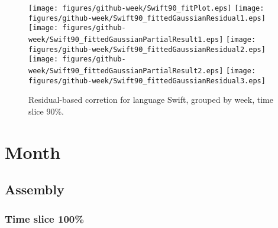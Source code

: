 \begin{figure}[t]
\centering
{}
{\texttt{[image: figures/github-week/Swift90\_fitPlot.eps]}}
{\texttt{[image: figures/github-week/Swift90\_fittedGaussianResidual1.eps]}}
{\texttt{[image: figures/github-week/Swift90\_fittedGaussianPartialResult1.eps]}}
{\texttt{[image: figures/github-week/Swift90\_fittedGaussianResidual2.eps]}}
{\texttt{[image: figures/github-week/Swift90\_fittedGaussianPartialResult2.eps]}}
{\texttt{[image: figures/github-week/Swift90\_fittedGaussianResidual3.eps]}}
\caption{Residual-based corretion for language Swift, grouped by week, time slice 90\%.}
\end{figure}


\FloatBarrier


\section{Month}

\subsection{Assembly}

\subsubsection{Time slice 100\%}

